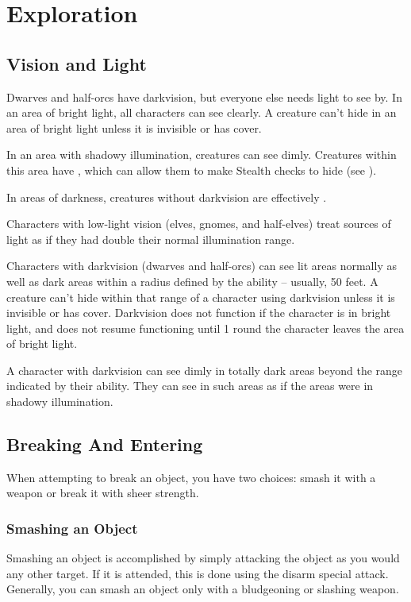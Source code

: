 \section{Exploration}
\subsection{Vision and Light}
Dwarves and half-orcs have darkvision, but everyone else needs light to see by.  In an area of bright light, all characters can see clearly. A creature can't hide in an area of bright light unless it is invisible or has cover.

In an area with shadowy illumination, creatures can see dimly.
Creatures within this area have \concealment, which can allow them to make Stealth checks to hide (see ).

In areas of darkness, creatures without darkvision are effectively \blinded.

Characters with low-light vision (elves, gnomes, and half-elves) treat sources of light as if they had double their normal illumination range.

Characters with darkvision (dwarves and half-orcs) can see lit areas normally as well as dark areas within a radius defined by the ability -- usually, 50 feet. A creature can't hide within that range of a character using darkvision unless it is invisible or has cover. Darkvision does not function if the character is in bright light, and does not resume functioning until 1 round the character leaves the area of bright light.

A character with darkvision can see dimly in totally dark areas beyond the range indicated by their ability. They can see in such areas as if the areas were in shadowy illumination.

\subsection{Breaking And Entering}
When attempting to break an object, you have two choices: smash it with a weapon or break it with sheer strength.

\subsubsection{Smashing an Object}
Smashing an object is accomplished by simply attacking the object as you would any other target. If it is attended, this is done using the disarm special attack. Generally, you can smash an object only with a bludgeoning or slashing weapon.

